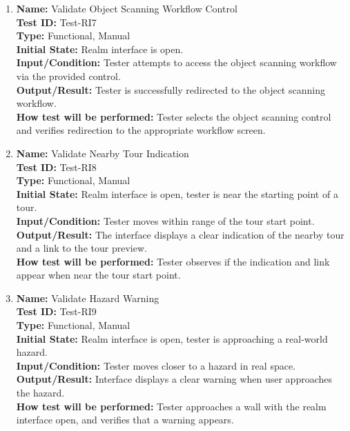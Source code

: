 \documentclass[12pt, titlepage]{article}
\begin{document}
\begin{enumerate}
\item \textbf{Name:} Validate Object Scanning Workflow Control \label{itm:Test-RI7} \\
\textbf{Test ID:} Test-RI7 \\
\textbf{Type:} Functional, Manual \\
\textbf{Initial State:} Realm interface is open. \\
\textbf{Input/Condition:} Tester attempts to access the object scanning workflow via the provided control. \\
\textbf{Output/Result:} Tester is successfully redirected to the object scanning workflow. \\
\textbf{How test will be performed:} Tester selects the object scanning control and verifies redirection to the appropriate workflow screen.


\item \textbf{Name:} Validate Nearby Tour Indication \label{itm:Test-RI8} \\
\textbf{Test ID:} Test-RI8 \\
\textbf{Type:} Functional, Manual \\
\textbf{Initial State:} Realm interface is open, tester is near the starting point of a tour. \\
\textbf{Input/Condition:} Tester moves within range of the tour start point. \\
\textbf{Output/Result:} The interface displays a clear indication of the nearby tour and a link to the tour preview. \\
\textbf{How test will be performed:} Tester observes if the indication and link appear when near the tour start point.

\item \textbf{Name:} Validate Hazard Warning \label{itm:Test-RI9} \\
\textbf{Test ID:} Test-RI9 \\
\textbf{Type:} Functional, Manual \\
\textbf{Initial State:} Realm interface is open, tester is approaching a real-world hazard. \\
\textbf{Input/Condition:} Tester moves closer to a hazard in real space. \\
\textbf{Output/Result:} Interface displays a clear warning when user approaches the hazard. \\
\textbf{How test will be performed:} Tester approaches a wall with the realm interface open, and verifies that a warning appears.



\end{enumerate}
\end{document}
